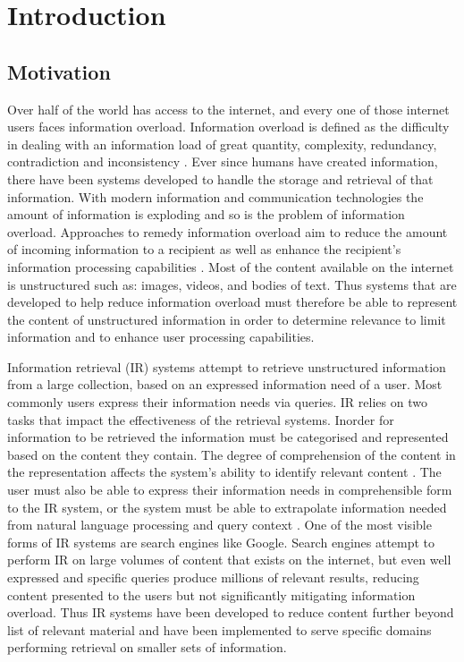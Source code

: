 \chapter{Introduction}

\section{Motivation}
\justify
Over half of the world has access to the internet, and every one of those internet users faces information overload. Information overload is defined as the difficulty in dealing with an information load of great quantity, complexity, redundancy, contradiction and inconsistency \citep{gross1964managing,roetzel2019information}. Ever since humans have created information, there have been systems developed to handle the storage and retrieval of that information. With modern information and communication technologies the amount of information is exploding and so is the problem of information overload. Approaches to remedy information overload aim to reduce  the amount of incoming information to a recipient as well as enhance the recipient’s information processing capabilities \citep{soucek2010coping}. Most of the content available on the internet is unstructured such as: images, videos, and bodies of text. Thus systems that are developed to help reduce information overload must therefore be able to represent the content of unstructured information in order to determine relevance to limit information and to enhance user processing capabilities.

Information retrieval (IR) systems attempt to retrieve unstructured information from a large collection, based on an expressed information need of a user. Most commonly users express their information needs via queries. IR relies on two tasks that impact the effectiveness of the retrieval systems. Inorder for information to be retrieved the information must be categorised and represented based on the content they contain. The degree of comprehension of the content in the representation affects the system's ability to identify relevant content \citep{chiaramella2000information}. The user must also be able to express their information needs in comprehensible form to the IR system, or the system must be able to extrapolate information needed from natural language processing and query context \citep{carpineto2012survey}. One of the most visible forms of IR systems are search engines like Google. Search engines attempt to perform IR on large volumes of content that exists on the internet, but even well expressed and specific queries produce millions of relevant results, reducing content presented to the users but not significantly mitigating information overload. Thus IR systems have been developed to reduce content further beyond list of relevant material and have been implemented to serve specific domains performing retrieval on smaller sets of information. 

